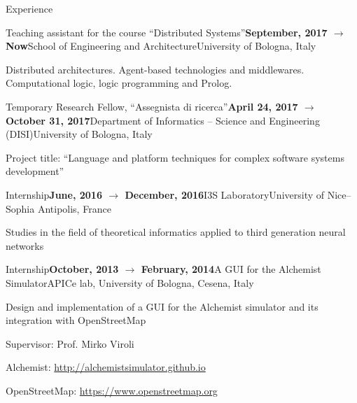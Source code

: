 \documentclass{resume} %
\begin{document}

\begin{rSection}{Experience}
	
\begin{rSubsection}{Teaching assistant for the course ``Distributed Systems''}{\textbf{September, 2017 $\rightarrow$ Now}}{School of Engineering and Architecture}{University of Bologna, Italy}
	\item Distributed architectures. Agent-based technologies and middlewares. Computational logic, logic programming and Prolog.
\end{rSubsection}
	
\begin{rSubsection}{Temporary Research Fellow, ``Assegnista di ricerca''}{\textbf{April 24, 2017 $\rightarrow$ October 31, 2017}}{Department of Informatics -- Science and Engineering (DISI)}{University of Bologna, Italy}
	\item Project title: ``Language and platform techniques for complex software systems development''
\end{rSubsection}

\begin{rSubsection}{Internship}{\textbf{June, 2016 $\rightarrow$ December, 2016}}{I3S Laboratory}{University of Nice--Sophia Antipolis, France}
	\item Studies in the field of theoretical informatics applied to third generation neural networks
\end{rSubsection}

\begin{rSubsection}{Internship}{\textbf{October, 2013 $\rightarrow$ February, 2014}}{A GUI for the Alchemist Simulator}{APICe lab, University of Bologna, Cesena, Italy}
\item Design and implementation of a GUI for the Alchemist simulator and its integration with OpenStreetMap
\item Supervisor: Prof. Mirko Viroli
\item Alchemist: \url{http://alchemistsimulator.github.io}
\item OpenStreetMap: \url{https://www.openstreetmap.org}
\end{rSubsection}

\end{rSection}
\end{document}
